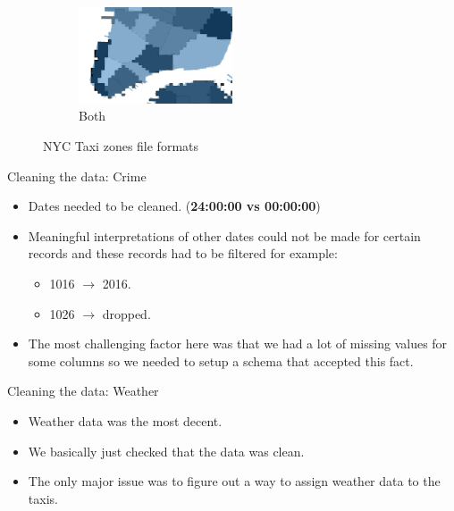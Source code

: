 \documentclass[10pt,ignorenonframetext,]{beamer}
\providecommand{\tightlist}{%
  \setlength{\itemsep}{0pt}\setlength{\parskip}{0pt}}
\begin{document}
\begin{frame}

\begin{figure}
    \begin{subfigure}[t]{0.8\textwidth}
        \centering
        \label{fig:zones_both}
        \includegraphics[width=0.5\textwidth]{../latex/images/both}
        \caption{Both}
    \end{subfigure}
    \caption{NYC Taxi zones file formats}
\end{figure}

\end{frame}

\begin{frame}

\begin{block}{Cleaning the data: Crime}

\begin{itemize}
\item
  Dates needed to be cleaned. (\textbf{24:00:00 vs 00:00:00})
\item
  Meaningful interpretations of other dates could not be made for
  certain records and these records had to be filtered for example:

  \begin{itemize}
  \tightlist
  \item
    1016 \(\rightarrow\) 2016.
  \item
    1026 \(\rightarrow\) dropped.
  \end{itemize}
\item
  The most challenging factor here was that we had a lot of missing
  values for some columns so we needed to setup a schema that accepted
  this fact.
\end{itemize}

\end{block}

\begin{block}{Cleaning the data: Weather}

\begin{itemize}
\tightlist
\item
  Weather data was the most decent.
\item
  We basically just checked that the data was clean.
\item
  The only major issue was to figure out a way to assign weather data to
  the taxis.
\end{itemize}

\end{block}

\end{frame}
\end{document}
